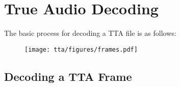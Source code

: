 
\section{True Audio Decoding}

The basic process for decoding a TTA file is as follows:
\par
\noindent
{
  
}
\begin{figure}[h]
  \texttt{[image: tta/figures/frames.pdf]}
\end{figure}

\clearpage

\subsection{Decoding a TTA Frame}
\label{tta:decode_frame}
{
  
}

\clearpage



